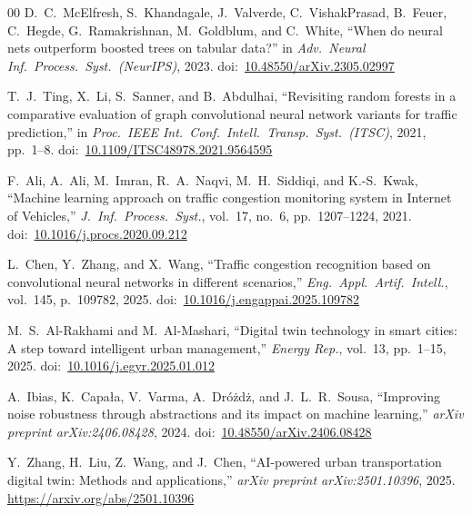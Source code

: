 \documentclass[conference,onecolumn,12pt]{IEEEtran}
\begin{document}
\begin{thebibliography}{00}
D.~C.~McElfresh, S.~Khandagale, J.~Valverde, C.~VishakPrasad, B.~Feuer,
C.~Hegde, G.~Ramakrishnan, M.~Goldblum, and C.~White,
``When do neural nets outperform boosted trees on tabular data?''
in \emph{Adv.\ Neural Inf.\ Process.\ Syst.\ (NeurIPS)}, 2023.
doi:~\href{https://doi.org/10.48550/arXiv.2305.02997}{10.48550/arXiv.2305.02997}

T.~J.~Ting, X.~Li, S.~Sanner, and B.~Abdulhai,
``Revisiting random forests in a comparative evaluation of graph convolutional
neural network variants for traffic prediction,''
in \emph{Proc.\ IEEE Int.\ Conf.\ Intell.\ Transp.\ Syst.\ (ITSC)}, 2021,
pp.~1--8.
doi:~\href{https://doi.org/10.1109/ITSC48978.2021.9564595}{10.1109/ITSC48978.2021.9564595}

F.~Ali, A.~Ali, M.~Imran, R.~A.~Naqvi, M.~H.~Siddiqi, and K.-S.~Kwak,
``Machine learning approach on traffic congestion monitoring system in Internet
of Vehicles,''
\emph{J.\ Inf.\ Process.\ Syst.}, vol.~17, no.~6, pp.~1207--1224, 2021.
doi:~\href{https://doi.org/10.1016/j.procs.2020.09.212}{10.1016/j.procs.2020.09.212}

L.~Chen, Y.~Zhang, and X.~Wang,
``Traffic congestion recognition based on convolutional neural networks in
different scenarios,''
\emph{Eng.\ Appl.\ Artif.\ Intell.}, vol.~145, p.~109782, 2025.
doi:~\href{https://doi.org/10.1016/j.engappai.2025.109782}{10.1016/j.engappai.2025.109782}

M.~S.~Al-Rakhami and M.~Al-Mashari,
``Digital twin technology in smart cities: A step toward intelligent urban
management,''
\emph{Energy Rep.}, vol.~13, pp.~1--15, 2025.
doi:~\href{https://doi.org/10.1016/j.egyr.2025.01.012}{10.1016/j.egyr.2025.01.012}

A.~Ibias, K.~Capa\l{}a, V.~Varma, A.~Dr\'o\.zd\.z, and J.~L.~R.~Sousa,
``Improving noise robustness through abstractions and its impact on machine
learning,''
\emph{arXiv preprint arXiv:2406.08428}, 2024.
doi:~\href{https://doi.org/10.48550/arXiv.2406.08428}{10.48550/arXiv.2406.08428}

Y.~Zhang, H.~Liu, Z.~Wang, and J.~Chen,
``AI-powered urban transportation digital twin: Methods and applications,''
\emph{arXiv preprint arXiv:2501.10396}, 2025.
\url{https://arxiv.org/abs/2501.10396}

\end{thebibliography}
\end{document}
